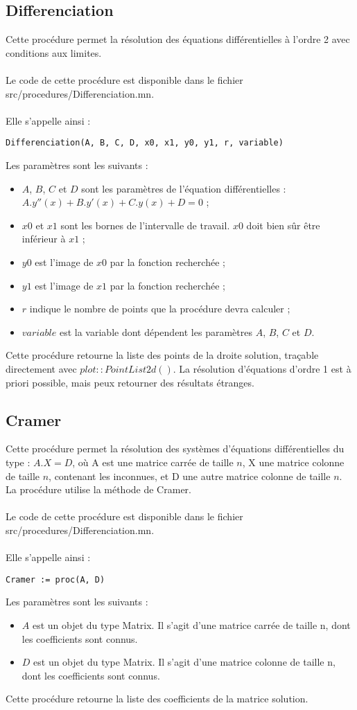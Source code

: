 \documentclass{report}
\begin{document}
\subsection{Differenciation}
Cette procédure permet la résolution des équations différentielles à l'ordre 2 avec conditions aux limites.
\\
\\
Le code de cette procédure est disponible dans le fichier src/procedures/Differenciation.mn.
\\
\\
Elle s'appelle ainsi : 
\begin{verbatim}
Differenciation(A, B, C, D, x0, x1, y0, y1, r, variable)
\end{verbatim}
Les paramètres sont les suivants : 
\begin{itemize}
    \item $A$, $B$, $C$ et $D$ sont les paramètres de l'équation différentielles : $A.y''(x) + B.y'(x) + C.y(x) + D = 0$ ;
    \item $x0$ et $x1$ sont les bornes de l'intervalle de travail. $x0$ doit bien sûr être inférieur à $x1$ ;
    \item $y0$ est l'image de $x0$ par la fonction recherchée ;
	\item $y1$ est l'image de $x1$ par la fonction recherchée ;
	\item $r$ indique le nombre de points que la procédure devra calculer ;
	\item $variable$ est la variable dont dépendent les paramètres $A$, $B$, $C$ et $D$.
\end{itemize}

Cette procédure retourne la liste des points de la droite solution, traçable directement avec $plot::PointList2d()$. La résolution d'équations d'ordre 1 est à priori possible, mais peux retourner des résultats étranges.

\subsection{Cramer}
Cette procédure permet la résolution des systèmes d'équations différentielles du type : 
$A.X = D$, où A est une matrice carrée de taille $n$, X une matrice colonne de taille $n$, contenant les inconnues, et D une autre matrice colonne de taille $n$. La procédure utilise la méthode de Cramer.
\\
\\
Le code de cette procédure est disponible dans le fichier src/procedures/Differenciation.mn.
\\
\\
Elle s'appelle ainsi : 
\begin{verbatim}
Cramer := proc(A, D)
\end{verbatim}
Les paramètres sont les suivants : 
\begin{itemize}
    \item $A$ est un objet du type Matrix. Il s'agit d'une matrice carrée de taille n, dont les coefficients sont connus.
    \item $D$ est un objet du type Matrix. Il s'agit d'une matrice colonne de taille n, dont les coefficients sont connus.
\end{itemize}

Cette procédure retourne la liste des coefficients de la matrice solution.
\end{document}
